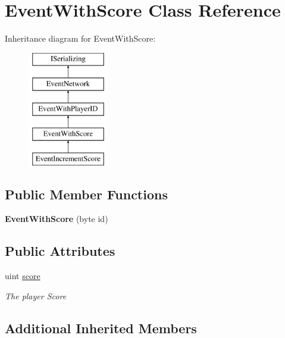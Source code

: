 \hypertarget{class_event_with_score}{\section{Event\-With\-Score Class Reference}
\label{class_event_with_score}
}
Inheritance diagram for Event\-With\-Score\-:\begin{figure}[H]
\begin{center}
\leavevmode
\includegraphics[height=5.000000cm]{class_event_with_score}
\end{center}
\end{figure}
\subsection*{Public Member Functions}
\begin{DoxyCompactItemize}
\item 
\hypertarget{class_event_with_score_afed686cec337ad6ba846ce5975194e09}{{\bfseries Event\-With\-Score} (byte id)}\label{class_event_with_score_afed686cec337ad6ba846ce5975194e09}

\end{DoxyCompactItemize}
\subsection*{Public Attributes}
\begin{DoxyCompactItemize}
\item 
uint \hyperlink{class_event_with_score_a521dbdffa1ed1b2a08a671d881f66062}{score}
\begin{DoxyCompactList}\small\item\em The player Score \end{DoxyCompactList}\end{DoxyCompactItemize}
\subsection*{Additional Inherited Members}


